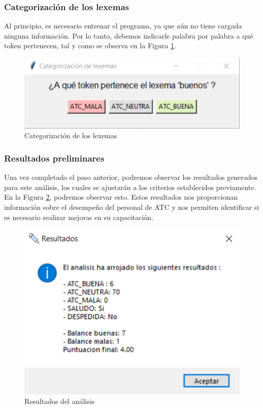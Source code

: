 \documentclass[10pt,times,twocolumn]{article}
\begin{document}
\subsubsection{Categorización de los lexemas}
Al principio, es necesario entrenar el programa, ya que aún no tiene cargada ninguna información. Por lo tanto, debemos indicarle palabra por palabra a qué token pertenecen, tal y como se observa en la Figura \ref{fig:graf_atc_paso3}.

\begin{figure}[H]
    \centering
    \includegraphics[width=\linewidth]{fig/ATC_paso3.png}
    \caption{Categorización de los lexemas}
    \label{fig:graf_atc_paso3}
\end{figure}

\subsubsection{Resultados preliminares}
Una vez completado el paso anterior, podremos observar los resultados generados para este análisis, los cuales se ajustarán a los criterios establecidos previamente. En la Figura \ref{fig:graf_atc_paso4}, podremos observar esto. Estos resultados nos proporcionan información sobre el desempeño del personal de ATC y nos permiten identificar si es necesario realizar mejoras en su capacitación.

\begin{figure}[H]
    \centering
    \includegraphics[width=\linewidth]{fig/ATC_paso4.png}
    \caption{Resultados del análisis}
    \label{fig:graf_atc_paso4}
\end{figure}
\end{document}
